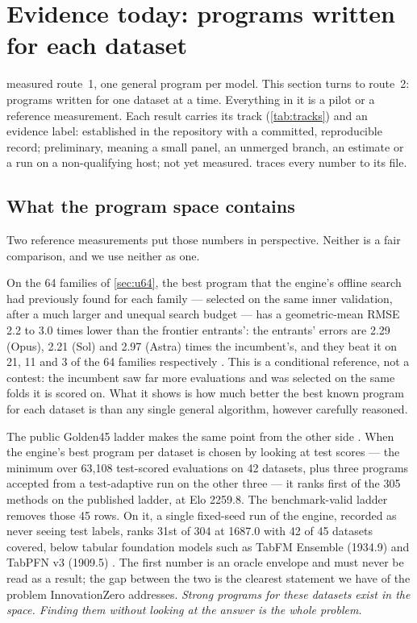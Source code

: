 \section{Evidence today: programs written for each dataset}
\label{sec:evidence}

 measured route~1, one general program per model. This section turns to route~2:
programs written for one dataset at a time. Everything in it is a pilot or a reference measurement. Each result carries its track
(\cref{tab:tracks}) and an evidence label: \est{} established in the repository with a committed,
reproducible record; \pre{} preliminary, meaning a small panel, an unmerged branch, an estimate or a
run on a non-qualifying host; \pend{} not yet measured.  traces every number to its
file.

\subsection{What the program space contains}
\label{sec:space}

Two reference measurements put those numbers in perspective. Neither is a fair comparison, and we
use neither as one.

On the 64 families of \cref{sec:u64}, the best program that the engine's offline search had previously found for
each family --- selected on the same inner validation, after a much larger and unequal search budget
--- has a geometric-mean RMSE 2.2 to 3.0 times lower than the frontier entrants': the entrants'
errors are 2.29 (Opus), 2.21 (Sol) and 2.97 (Astra) times the incumbent's, and they beat it on 21, 11
and 3 of the 64 families respectively \pre. This is a conditional reference, not a contest: the
incumbent saw far more evaluations and was selected on the same folds it is scored on. What it shows
is how much better the best known program for each dataset is than any single general algorithm,
however carefully reasoned.

The public Golden45 ladder makes the same point from the other side \est. When the engine's best
program per dataset is chosen by looking at test scores --- the minimum over 63,108 test-scored
evaluations on 42 datasets, plus three programs accepted from a test-adaptive run on the other
three --- it ranks first of the 305 methods on the published ladder, at Elo 2259.8. The
benchmark-valid ladder removes those 45 rows. On it, a single fixed-seed run of the engine, recorded
as never seeing test labels, ranks 31st of 304 at 1687.0 with 42 of 45 datasets covered, below
tabular foundation models such as TabFM Ensemble
(1934.9) and TabPFN v3 (1909.5) \citep{hollmann2025tabpfn}. The first number is an oracle envelope
and must never be read as a result; the gap between the two is the clearest statement we have of
the problem InnovationZero addresses. \emph{Strong programs for these datasets exist in the space.
Finding them without looking at the answer is the whole problem.}

